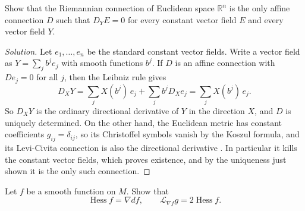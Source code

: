 \begin{exercise}
\label{exercise-santos-lobos-euclidean}
Show that the Riemannian connection of
Euclidean space $\mathbb{R}^n$ is the only
affine connection $D$ such that
$D_Y E = 0$ for every constant vector field
$E$ and every vector field $Y$.
\end{exercise}

\begin{proof}[Solution]
Let $e_1, \ldots, e_n$ be the standard
constant vector fields. Write a vector
field as $Y = \sum_j b^j e_j$ with smooth
functions $b^j$. If $D$ is an affine
connection with $D e_j = 0$ for all $j$,
then the Leibniz rule gives
$$
D_X Y = \sum_j X(b^j)\, e_j
+ \sum_j b^j D_X e_j
= \sum_j X(b^j)\, e_j.
$$
So $D_X Y$ is the ordinary directional
derivative of $Y$ in the direction $X$, and
$D$ is uniquely determined. On the other
hand, the Euclidean metric has constant
coefficients $g_{ij} = \delta_{ij}$, so its
Christoffel symbols vanish by the Koszul
formula, and its Levi-Civita connection is
also the directional derivative
\cite[Section 1.3, equations (1.4) and
(1.5)]{gomes2015operadores}. In particular
it kills the constant vector fields, which
proves existence, and by the uniqueness just
shown it is the only such connection.
\end{proof}

\begin{exercise}
\label{exercise-santos-lobos-hessian}
Let $f$ be a smooth function on $M$. Show
that
$$
\operatorname{Hess} f = \nabla df,
\qquad
\mathcal{L}_{\nabla f} g =
2 \operatorname{Hess} f.
$$
\end{exercise}

